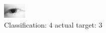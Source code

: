 \begin{figure}[h!]
\begin{center}
\includegraphics[width=0.60\columnwidth]{figures/ID170_class_4_target_3.png}
\end{center}
\caption{ Classification: 4 actual target: 3}
\label{fig:ID170_class_4_target_3}
\end{figure}
